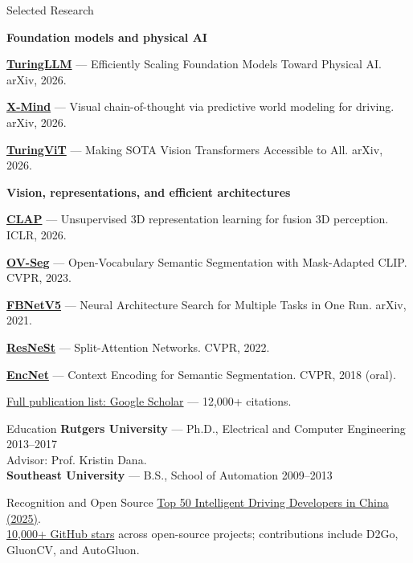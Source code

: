 \documentclass{resume}
\newcommand{\researchitem}[3]{\par\noindent\href{#1}{\textbf{#2}} --- #3\par}
\begin{document}
\begin{rSection}{Selected Research}
{\small
\textbf{Foundation models and physical AI}
\researchitem{https://arxiv.org/abs/2608.30567}{TuringLLM}{Efficiently Scaling Foundation Models Toward Physical AI. arXiv, 2026.}
\researchitem{https://arxiv.org/abs/2606.28758}{X-Mind}{Visual chain-of-thought via predictive world modeling for driving. arXiv, 2026.}
\researchitem{https://arxiv.org/abs/2606.24253}{TuringViT}{Making SOTA Vision Transformers Accessible to All. arXiv, 2026.}
\textbf{Vision, representations, and efficient architectures}
\researchitem{https://scholar.google.com/citations?user=gCoWdkUAAAAJ}{CLAP}{Unsupervised 3D representation learning for fusion 3D perception. ICLR, 2026.}
\researchitem{https://openaccess.thecvf.com/content/CVPR2023/papers/Liang_Open-Vocabulary_Semantic_Segmentation_With_Mask-Adapted_CLIP_CVPR_2023_paper.pdf}{OV-Seg}{Open-Vocabulary Semantic Segmentation with Mask-Adapted CLIP. CVPR, 2023.}
\researchitem{https://arxiv.org/abs/2111.10007}{FBNetV5}{Neural Architecture Search for Multiple Tasks in One Run. arXiv, 2021.}
\researchitem{https://scholar.google.com/citations?view_op=view_citation&user=gCoWdkUAAAAJ&citation_for_view=gCoWdkUAAAAJ:0KyAp5RtaNEC}{ResNeSt}{Split-Attention Networks. CVPR, 2022.}
\researchitem{https://scholar.google.com/citations?view_op=view_citation&user=gCoWdkUAAAAJ&citation_for_view=gCoWdkUAAAAJ:9Nmd_mFXekcC}{EncNet}{Context Encoding for Semantic Segmentation. CVPR, 2018 (oral).}
\href{https://scholar.google.com/citations?user=gCoWdkUAAAAJ}{Full publication list: Google Scholar} --- 12,000+ citations.
}
\end{rSection}

\begin{rSection}{Education}
\textbf{Rutgers University} --- Ph.D., Electrical and Computer Engineering \hfill 2013--2017\\
Advisor: Prof. Kristin Dana.\\
\textbf{Southeast University} --- B.S., School of Automation \hfill 2009--2013
\end{rSection}

\begin{rSection}{Recognition and Open Source}
\href{https://www.163.com/dy/article/KK6K284605278VAD.html}{Top 50 Intelligent Driving Developers in China (2025)}.\\
\href{https://github.com/zhanghang1989}{10,000+ GitHub stars} across open-source projects; contributions include D2Go, GluonCV, and AutoGluon.
\end{rSection}
\end{document}
